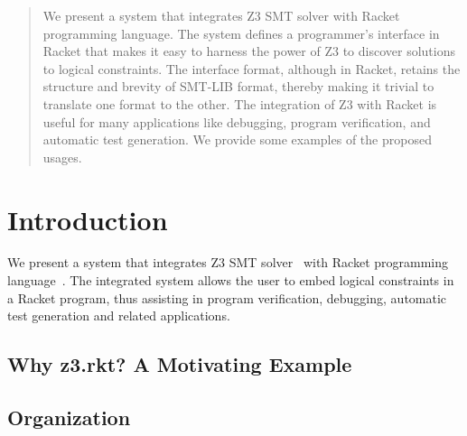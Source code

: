 \begin{abstract}
  We present a system that integrates Z3 SMT solver with
  Racket programming language. The system defines a programmer's
  interface in Racket that makes it easy to harness the power
  of Z3 to discover solutions to logical constraints. The
  interface format, although in Racket, retains the structure
  and brevity of SMT-LIB format, thereby making it trivial to
  translate one format to the other. The integration of Z3
  with Racket is useful for many applications like debugging,
  program verification, and automatic test generation. We
  provide some examples of the proposed usages.
\end{abstract}
\section{Introduction}
We present a system that integrates Z3 SMT solver~\cite{z3} with
Racket programming language~\cite{racket}. The integrated
system allows the user to embed logical constraints in a
Racket program, thus assisting in program verification,
debugging, automatic test generation and related
applications.

\subsection{Why z3.rkt? A Motivating Example}


\subsection{Organization}
